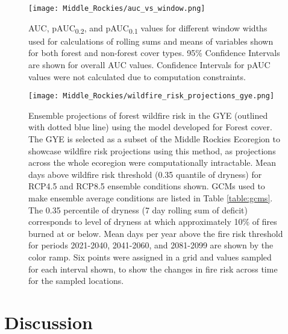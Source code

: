\documentclass[11pt]{article}
\newcommand{\pauc}[1]{pAUC\textsubscript{#1}}
\begin{document}
\begin{figure}[ht]
  \centering
  \texttt{[image: Middle\_Rockies/auc\_vs\_window.png]}
  \caption{AUC, \pauc{0.2}, and \pauc{0.1} values for different window widths used for calculations of rolling sums and means of variables shown for both forest and non-forest cover types. 95\% Confidence Intervals are shown for overall AUC values.  Confidence Intervals for pAUC values were not calculated due to computation constraints.}
  \label{fig:auc_window}
\end{figure}

\begin{figure}
  \centering
  \texttt{[image: Middle\_Rockies/wildfire\_risk\_projections\_gye.png]}
  \caption{Ensemble projections of forest wildfire risk in the GYE (outlined with dotted blue line) using the model developed for Forest cover. The GYE is selected as a subset of the Middle Rockies Ecoregion to showcase wildfire risk projections using this method, as projections across the whole ecoregion were computationally intractable. Mean days above wildfire risk threshold (0.35 quantile of dryness) for RCP4.5 and RCP8.5 ensemble conditions shown. GCMs used to make ensemble average conditions are listed in Table \ref{table:gcms}. The 0.35 percentile of dryness (7 day rolling sum of deficit) corresponds to level of dryness at which approximately 10\% of fires burned at or below. Mean days per year above the fire risk threshold for periods 2021-2040, 2041-2060, and 2081-2099 are shown by the color ramp. Six points were assigned in a grid and values sampled for each interval shown, to show the changes in fire risk across time for the sampled locations.}
  \label{fig:projected-risk}
\end{figure}

\section{Discussion}
\end{document}
